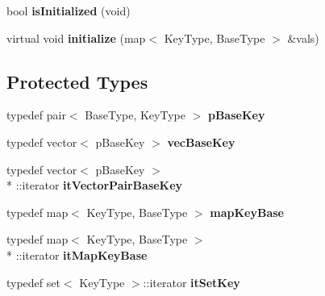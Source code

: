\begin{DoxyCompactItemize}
\item 
\hypertarget{classMultiBoost_1_1GenericBanditAlgorithmLS_a7676523990c78432eee71a949be51b0c}{bool {\bfseries is\-Initialized} (void)}\label{classMultiBoost_1_1GenericBanditAlgorithmLS_a7676523990c78432eee71a949be51b0c}

\item 
\hypertarget{classMultiBoost_1_1GenericBanditAlgorithmLS_a57b307256cb71c5f2b6fc2b2530fcbe6}{virtual void {\bfseries initialize} (map$<$ Key\-Type, Base\-Type $>$ \&vals)}\label{classMultiBoost_1_1GenericBanditAlgorithmLS_a57b307256cb71c5f2b6fc2b2530fcbe6}

\end{DoxyCompactItemize}
\subsection*{Protected Types}
\begin{DoxyCompactItemize}
\item 
\hypertarget{classMultiBoost_1_1GenericBanditAlgorithmLS_a012c03d57e531ee49fec43158acce1e6}{typedef pair$<$ Base\-Type, Key\-Type $>$ {\bfseries p\-Base\-Key}}\label{classMultiBoost_1_1GenericBanditAlgorithmLS_a012c03d57e531ee49fec43158acce1e6}

\item 
\hypertarget{classMultiBoost_1_1GenericBanditAlgorithmLS_af7a52aff0c9de19e0a2215ed762081f4}{typedef vector$<$ p\-Base\-Key $>$ {\bfseries vec\-Base\-Key}}\label{classMultiBoost_1_1GenericBanditAlgorithmLS_af7a52aff0c9de19e0a2215ed762081f4}

\item 
\hypertarget{classMultiBoost_1_1GenericBanditAlgorithmLS_ab313cf4a6fc41a3359c0a9dea35c0343}{typedef vector$<$ p\-Base\-Key $>$\\*
\-::iterator {\bfseries it\-Vector\-Pair\-Base\-Key}}\label{classMultiBoost_1_1GenericBanditAlgorithmLS_ab313cf4a6fc41a3359c0a9dea35c0343}

\item 
\hypertarget{classMultiBoost_1_1GenericBanditAlgorithmLS_a0d82457b7f8d8f8006f99a796d05a4f8}{typedef map$<$ Key\-Type, Base\-Type $>$ {\bfseries map\-Key\-Base}}\label{classMultiBoost_1_1GenericBanditAlgorithmLS_a0d82457b7f8d8f8006f99a796d05a4f8}

\item 
\hypertarget{classMultiBoost_1_1GenericBanditAlgorithmLS_a2769ff46ffdea1ed2360077ac38b771a}{typedef map$<$ Key\-Type, Base\-Type $>$\\*
\-::iterator {\bfseries it\-Map\-Key\-Base}}\label{classMultiBoost_1_1GenericBanditAlgorithmLS_a2769ff46ffdea1ed2360077ac38b771a}

\item 
\hypertarget{classMultiBoost_1_1GenericBanditAlgorithmLS_a1d76273ebb23f00e46bf99440e444366}{typedef set$<$ Key\-Type $>$\-::iterator {\bfseries it\-Set\-Key}}\label{classMultiBoost_1_1GenericBanditAlgorithmLS_a1d76273ebb23f00e46bf99440e444366}

\end{DoxyCompactItemize}
